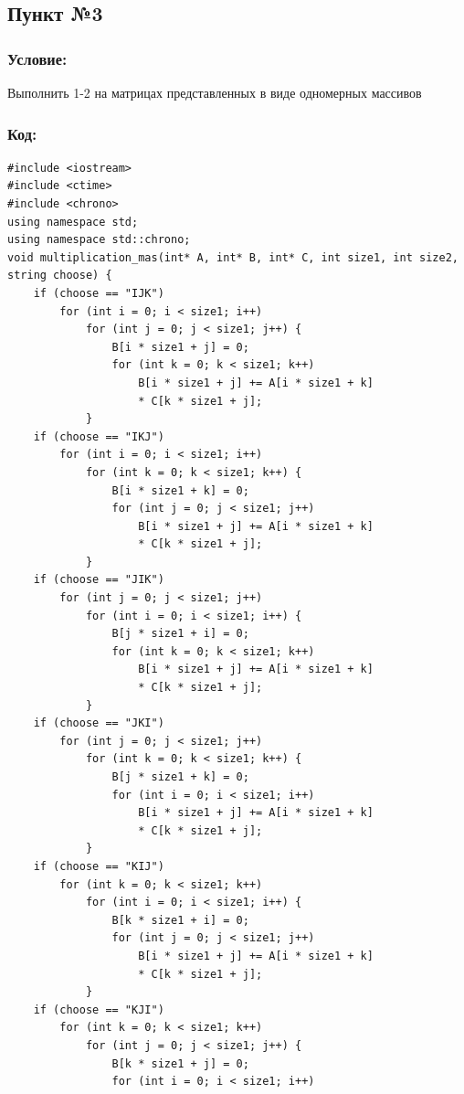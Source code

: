 \documentclass[a4paper]{article}
\begin{document}
\subsection{Пункт №3}
\subsubsection{Условие:}
Выполнить 1-2 на матрицах представленных в виде одномерных массивов
\subsubsection{Код:}\scriptsize
\begin{verbatim}
#include <iostream>
#include <ctime>
#include <chrono>
using namespace std;
using namespace std::chrono;
void multiplication_mas(int* A, int* B, int* C, int size1, int size2, string choose) {
    if (choose == "IJK")
        for (int i = 0; i < size1; i++)
            for (int j = 0; j < size1; j++) {
                B[i * size1 + j] = 0;
                for (int k = 0; k < size1; k++)
                    B[i * size1 + j] += A[i * size1 + k]
                    * C[k * size1 + j];
            }
    if (choose == "IKJ")
        for (int i = 0; i < size1; i++)
            for (int k = 0; k < size1; k++) {
                B[i * size1 + k] = 0;
                for (int j = 0; j < size1; j++)
                    B[i * size1 + j] += A[i * size1 + k]
                    * C[k * size1 + j];
            }
    if (choose == "JIK")
        for (int j = 0; j < size1; j++)
            for (int i = 0; i < size1; i++) {
                B[j * size1 + i] = 0;
                for (int k = 0; k < size1; k++)
                    B[i * size1 + j] += A[i * size1 + k]
                    * C[k * size1 + j];
            }
    if (choose == "JKI")
        for (int j = 0; j < size1; j++)
            for (int k = 0; k < size1; k++) {
                B[j * size1 + k] = 0;
                for (int i = 0; i < size1; i++)
                    B[i * size1 + j] += A[i * size1 + k]
                    * C[k * size1 + j];
            }
    if (choose == "KIJ")
        for (int k = 0; k < size1; k++)
            for (int i = 0; i < size1; i++) {
                B[k * size1 + i] = 0;
                for (int j = 0; j < size1; j++)
                    B[i * size1 + j] += A[i * size1 + k]
                    * C[k * size1 + j];
            }
    if (choose == "KJI")
        for (int k = 0; k < size1; k++)
            for (int j = 0; j < size1; j++) {
                B[k * size1 + j] = 0;
                for (int i = 0; i < size1; i++)

\end{verbatim}
\end{document}
